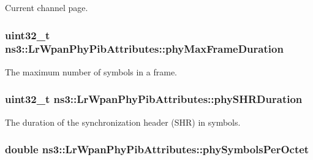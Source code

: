 Current channel page. 

\subsubsection[{\texorpdfstring{phy\+Max\+Frame\+Duration}{phyMaxFrameDuration}}]{\setlength{\rightskip}{0pt plus 5cm}uint32\+\_\+t ns3\+::\+Lr\+Wpan\+Phy\+Pib\+Attributes\+::phy\+Max\+Frame\+Duration}\hypertarget{structns3_1_1LrWpanPhyPibAttributes_ad1b1881fc2d7d2932289b0aa466cd38e}{}\label{structns3_1_1LrWpanPhyPibAttributes_ad1b1881fc2d7d2932289b0aa466cd38e}


The maximum number of symbols in a frame. 

\subsubsection[{\texorpdfstring{phy\+S\+H\+R\+Duration}{phySHRDuration}}]{\setlength{\rightskip}{0pt plus 5cm}uint32\+\_\+t ns3\+::\+Lr\+Wpan\+Phy\+Pib\+Attributes\+::phy\+S\+H\+R\+Duration}\hypertarget{structns3_1_1LrWpanPhyPibAttributes_aab1a755b2d7e44e183c2ec7c53f4226e}{}\label{structns3_1_1LrWpanPhyPibAttributes_aab1a755b2d7e44e183c2ec7c53f4226e}


The duration of the synchronization header (S\+HR) in symbols. 

\subsubsection[{\texorpdfstring{phy\+Symbols\+Per\+Octet}{phySymbolsPerOctet}}]{\setlength{\rightskip}{0pt plus 5cm}double ns3\+::\+Lr\+Wpan\+Phy\+Pib\+Attributes\+::phy\+Symbols\+Per\+Octet}\hypertarget{structns3_1_1LrWpanPhyPibAttributes_a7fd39e2ca8da87b2bdc6260983c15a5d}{}\label{structns3_1_1LrWpanPhyPibAttributes_a7fd39e2ca8da87b2bdc6260983c15a5d}


